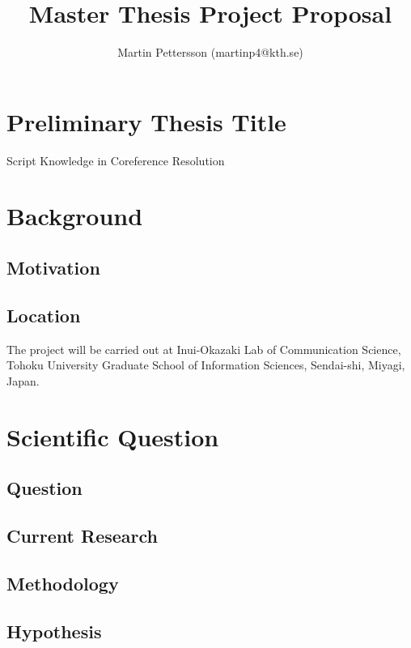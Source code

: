 \documentclass{article}
\begin{document}
\title{Master Thesis Project Proposal}
\author{Martin Pettersson (martinp4@kth.se)}
\maketitle

\section{Preliminary Thesis Title}
Script Knowledge in Coreference Resolution

\section{Background}

\subsection{Motivation}

\subsection{Location}
The project will be carried out at Inui-Okazaki Lab of Communication Science, Tohoku University Graduate School of Information Sciences, Sendai-shi, Miyagi, Japan.

\section{Scientific Question}

\subsection{Question}

\subsection{Current Research}

\subsection{Methodology}

\subsection{Hypothesis}
\end{document}
